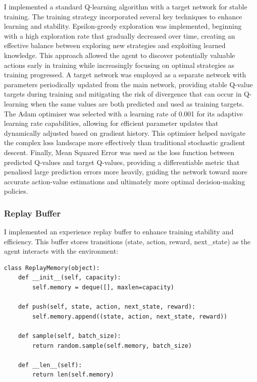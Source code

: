 I implemented a standard Q-learning algorithm with a target network for stable training. 
The training strategy incorporated several key techniques to enhance learning and stability. 
Epsilon-greedy exploration was implemented, beginning with a high exploration rate that gradually decreased over time, creating an effective balance between exploring new strategies and exploiting learned knowledge. 
This approach allowed the agent to discover potentially valuable actions early in training while increasingly focusing on optimal strategies as training progressed. 
A target network was employed as a separate network with parameters periodically updated from the main network, providing stable Q-value targets during training and mitigating the risk of divergence that can occur in Q-learning when the same values are both predicted and used as training targets.
The Adam optimiser was selected with a learning rate of 0.001 for its adaptive learning rate capabilities, allowing for efficient parameter updates that dynamically adjusted based on gradient history. 
This optimiser helped navigate the complex loss landscape more effectively than traditional stochastic gradient descent. 
Finally, Mean Squared Error was used as the loss function between predicted Q-values and target Q-values, providing a differentiable metric that penalised large prediction errors more heavily, guiding the network toward more accurate action-value estimations and ultimately more optimal decision-making policies.

\subsubsection{Replay Buffer}

I implemented an experience replay buffer to enhance training stability and efficiency. 
This buffer stores transitions (state, action, reward, next\_state) as the agent interacts with the environment:

\singlespaced
\begin{verbatim}
class ReplayMemory(object):
    def __init__(self, capacity):
        self.memory = deque([], maxlen=capacity)
    
    def push(self, state, action, next_state, reward):
        self.memory.append((state, action, next_state, reward))
    
    def sample(self, batch_size):
        return random.sample(self.memory, batch_size)
    
    def __len__(self):
        return len(self.memory)
\end{verbatim}
\doublespaced

